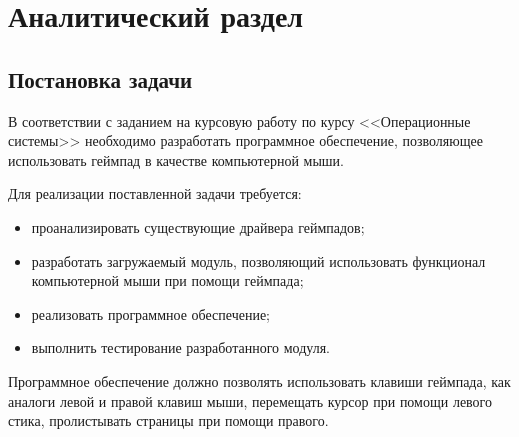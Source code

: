 \section{Аналитический раздел}
\subsection{Постановка задачи}
В соответствии с заданием на курсовую работу по курсу <<Операционные системы>> необходимо разработать программное обеспечение,
позволяющее использовать геймпад в качестве компьютерной мыши.\par
Для реализации поставленной задачи требуется:
\begin{itemize}
	\item проанализировать существующие драйвера геймпадов;
	\item разработать загружаемый модуль, позволяющий использовать функционал компьютерной мыши
	при помощи геймпада;
	\item реализовать программное обеспечение;
	\item выполнить тестирование разработанного модуля.
\end{itemize}
Программное обеспечение должно позволять использовать клавиши геймпада, как аналоги левой и правой клавиш мыши, перемещать курсор при помощи левого стика, пролистывать страницы при помощи правого.\par

